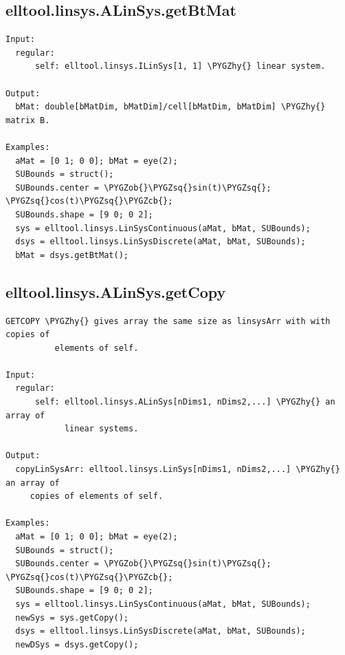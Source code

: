 \documentclass[letterpaper,10pt,english]{sphinxmanual}
\def\PYGZob{\char`\{}
\def\PYGZcb{\char`\}}
\def\PYGZhy{\char`\-}
\def\PYGZsq{\char`\'}
\begin{document}
\subsection{elltool.linsys.ALinSys.getBtMat}
\label{chap_functions:elltool-linsys-alinsys-getbtmat}
\begin{Verbatim}[commandchars=\\\{\}]
Input:
  regular:
      self: elltool.linsys.ILinSys[1, 1] \PYGZhy{} linear system.

Output:
  bMat: double[bMatDim, bMatDim]/cell[bMatDim, bMatDim] \PYGZhy{} matrix B.

Examples:
  aMat = [0 1; 0 0]; bMat = eye(2);
  SUBounds = struct();
  SUBounds.center = \PYGZob{}\PYGZsq{}sin(t)\PYGZsq{}; \PYGZsq{}cos(t)\PYGZsq{}\PYGZcb{};
  SUBounds.shape = [9 0; 0 2];
  sys = elltool.linsys.LinSysContinuous(aMat, bMat, SUBounds);
  dsys = elltool.linsys.LinSysDiscrete(aMat, bMat, SUBounds);
  bMat = dsys.getBtMat();
\end{Verbatim}


\subsection{elltool.linsys.ALinSys.getCopy}
\label{chap_functions:elltool-linsys-alinsys-getcopy}
\begin{Verbatim}[commandchars=\\\{\}]
GETCOPY \PYGZhy{} gives array the same size as linsysArr with with copies of
          elements of self.

Input:
  regular:
      self: elltool.linsys.ALinSys[nDims1, nDims2,...] \PYGZhy{} an array of
            linear systems.

Output:
  copyLinSysArr: elltool.linsys.LinSys[nDims1, nDims2,...] \PYGZhy{}  an array of
     copies of elements of self.

Examples:
  aMat = [0 1; 0 0]; bMat = eye(2);
  SUBounds = struct();
  SUBounds.center = \PYGZob{}\PYGZsq{}sin(t)\PYGZsq{}; \PYGZsq{}cos(t)\PYGZsq{}\PYGZcb{};
  SUBounds.shape = [9 0; 0 2];
  sys = elltool.linsys.LinSysContinuous(aMat, bMat, SUBounds);
  newSys = sys.getCopy();
  dsys = elltool.linsys.LinSysDiscrete(aMat, bMat, SUBounds);
  newDSys = dsys.getCopy();
\end{Verbatim}
\end{document}
